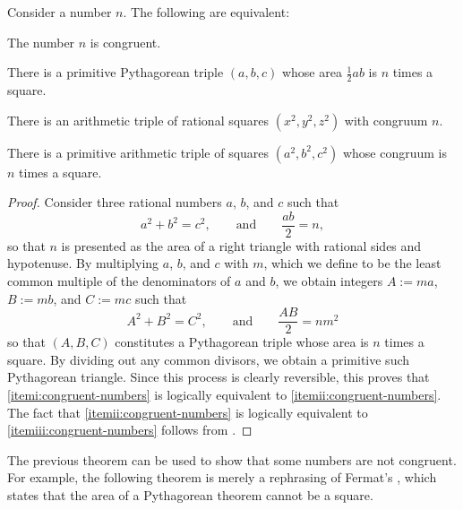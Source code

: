 \begin{lemma}\label{lemma:congruent-numbers}
  Consider a number $n$. The following are equivalent:
  \begin{nobreakenumerate}
  \item \label{itemi:congruent-numbers}The number $n$ is congruent.
  \item \label{itemii:congruent-numbers}There is a primitive Pythagorean triple $(a,b,c)$ whose area $\frac{1}{2}ab$ is $n$ times a square.
  \item \label{itemiii:congruent-numbers}There is an arithmetic triple of rational squares $(x^2,y^2,z^2)$ with congruum $n$.
  \item \label{itemiv:congruent-numbers}There is a primitive arithmetic triple of squares $(a^2,b^2,c^2)$ whose congruum is $n$ times a square.
  \end{nobreakenumerate}
\end{lemma}

\begin{proof}
  Consider three rational numbers $a$, $b$, and $c$ such that
  \begin{equation*}
    a^2+b^2=c^2,\qquad\text{and}\qquad \frac{ab}{2}=n,
  \end{equation*}
  so that $n$ is presented as the area of a right triangle with rational sides and hypotenuse. By multiplying $a$, $b$, and $c$ with $m$, which we define to be the least common multiple of the denominators of $a$ and $b$, we obtain integers $A:= ma$, $B:= mb$, and $C:= mc$ such that
  \begin{equation*}
    A^2+B^2=C^2,\qquad\text{and}\qquad \frac{AB}{2}=nm^2
  \end{equation*}
  so that $(A,B,C)$ constitutes a Pythagorean triple whose area is $n$ times a square. By dividing out any common divisors, we obtain a primitive such Pythagorean triangle. Since this process is clearly reversible, this proves that \ref{itemi:congruent-numbers} is logically equivalent to \ref{itemii:congruent-numbers}. The fact that \ref{itemii:congruent-numbers} is logically equivalent to \ref{itemiii:congruent-numbers} follows from .
\end{proof}

The previous theorem can be used to show that some numbers are not congruent. For example, the following theorem is merely a rephrasing of Fermat's , which states that the area of a Pythagorean theorem cannot be a square.

